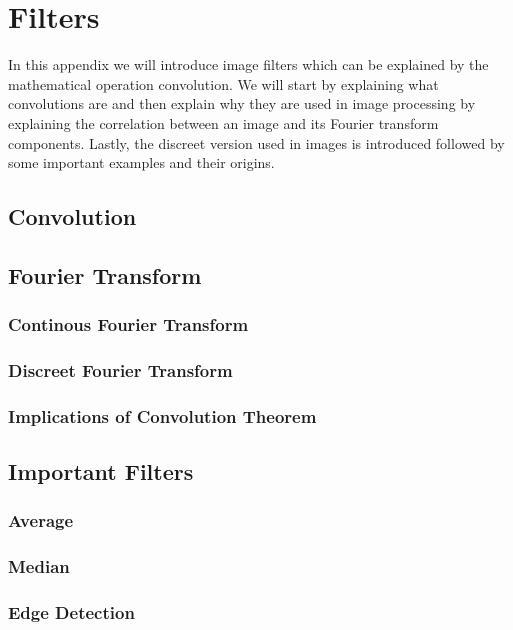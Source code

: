 \chapter{Filters}
\label{chap:filters}

In this appendix we will introduce image filters which can be explained by the mathematical operation convolution. We will start by explaining what convolutions are and then explain why they are used in image processing by explaining the correlation between an image and its Fourier transform components. Lastly, the discreet version used in images is introduced followed by some important examples and their origins.

\section{Convolution}

\section{Fourier Transform}

\subsection{Continous Fourier Transform}

\subsection{Discreet Fourier Transform}

\subsection{Implications of Convolution Theorem}

\section{Important Filters}

\subsection{Average}

\subsection{Median}

\subsection{Edge Detection}
